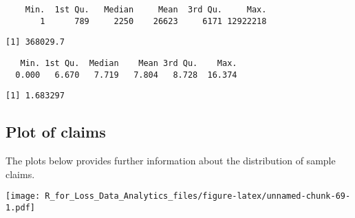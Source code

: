 \documentclass[]{book}
\newenvironment{Shaded}{\begin{snugshade}}{\end{snugshade}}
\newcommand{\KeywordTok}[1]{\textcolor[rgb]{0.13,0.29,0.53}{\textbf{#1}}}
\newcommand{\DataTypeTok}[1]{\textcolor[rgb]{0.13,0.29,0.53}{#1}}
\newcommand{\DecValTok}[1]{\textcolor[rgb]{0.00,0.00,0.81}{#1}}
\newcommand{\StringTok}[1]{\textcolor[rgb]{0.31,0.60,0.02}{#1}}
\newcommand{\CommentTok}[1]{\textcolor[rgb]{0.56,0.35,0.01}{\textit{#1}}}
\newcommand{\OperatorTok}[1]{\textcolor[rgb]{0.81,0.36,0.00}{\textbf{#1}}}
\newcommand{\NormalTok}[1]{#1}
\theoremstyle{definition}
\theoremstyle{definition}
\theoremstyle{definition}
\theoremstyle{remark}
\begin{document}
\begin{verbatim}
    Min.  1st Qu.   Median     Mean  3rd Qu.     Max. 
       1      789     2250    26623     6171 12922218 
\end{verbatim}

\begin{verbatim}
[1] 368029.7
\end{verbatim}

\begin{Shaded}
\end{Shaded}

\begin{verbatim}
   Min. 1st Qu.  Median    Mean 3rd Qu.    Max. 
  0.000   6.670   7.719   7.804   8.728  16.374 
\end{verbatim}

\begin{verbatim}
[1] 1.683297
\end{verbatim}

\subsection{Plot of claims}\label{plot-of-claims}

The plots below provides further information about the distribution of
sample claims.

\begin{Shaded}
\end{Shaded}

\texttt{[image: R\_for\_Loss\_Data\_Analytics\_files/figure-latex/unnamed-chunk-69-1.pdf]}
\end{document}
